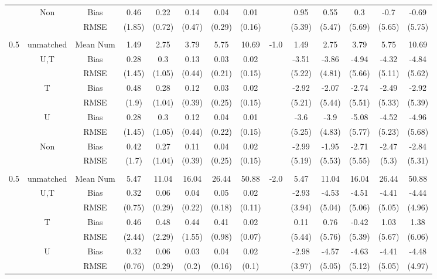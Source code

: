 \begin{tabular}{@{\extracolsep{5pt}}lc|cccccc|lccccc}
 & Non & Bias & 0.46 & 0.22 & 0.14 & 0.04 & 0.01 &  & 0.95 & 0.55 & 0.3 & -0.7 & -0.69 \\
 &  & RMSE & (1.85) & (0.72) & (0.47) & (0.29) & (0.16) &  & (5.39) & (5.47) & (5.69) & (5.65) & (5.75) \\
 &  &  &  &  &  &  &  &  &  &  &  &  &  \\
0.5 & unmatched & Mean Num & 1.49 & 2.75 & 3.79 & 5.75 & 10.69 & -1.0 & 1.49 & 2.75 & 3.79 & 5.75 & 10.69 \\
 & U,T & Bias & 0.28 & 0.3 & 0.13 & 0.03 & 0.02 &  & -3.51 & -3.86 & -4.94 & -4.32 & -4.84 \\
 &  & RMSE & (1.45) & (1.05) & (0.44) & (0.21) & (0.15) &  & (5.22) & (4.81) & (5.66) & (5.11) & (5.62) \\
 & T & Bias & 0.48 & 0.28 & 0.12 & 0.03 & 0.02 &  & -2.92 & -2.07 & -2.74 & -2.49 & -2.92 \\
 &  & RMSE & (1.9) & (1.04) & (0.39) & (0.25) & (0.15) &  & (5.21) & (5.44) & (5.51) & (5.33) & (5.39) \\
 & U & Bias & 0.28 & 0.3 & 0.12 & 0.04 & 0.01 &  & -3.6 & -3.9 & -5.08 & -4.52 & -4.96 \\
 &  & RMSE & (1.45) & (1.05) & (0.44) & (0.22) & (0.15) &  & (5.25) & (4.83) & (5.77) & (5.23) & (5.68) \\
 & Non & Bias & 0.42 & 0.27 & 0.11 & 0.04 & 0.02 &  & -2.99 & -1.95 & -2.71 & -2.47 & -2.84 \\
 &  & RMSE & (1.7) & (1.04) & (0.39) & (0.25) & (0.15) &  & (5.19) & (5.53) & (5.55) & (5.3) & (5.31) \\
 &  &  &  &  &  &  &  &  &  &  &  &  &  \\
0.5 & unmatched & Mean Num & 5.47 & 11.04 & 16.04 & 26.44 & 50.88 & -2.0 & 5.47 & 11.04 & 16.04 & 26.44 & 50.88 \\
 & U,T & Bias & 0.32 & 0.06 & 0.04 & 0.05 & 0.02 &  & -2.93 & -4.53 & -4.51 & -4.41 & -4.44 \\
 &  & RMSE & (0.75) & (0.29) & (0.22) & (0.18) & (0.11) &  & (3.94) & (5.04) & (5.06) & (5.05) & (4.96) \\
 & T & Bias & 0.46 & 0.48 & 0.44 & 0.41 & 0.02 &  & 0.11 & 0.76 & -0.42 & 1.03 & 1.38 \\
 &  & RMSE & (2.44) & (2.29) & (1.55) & (0.98) & (0.07) &  & (5.44) & (5.76) & (5.39) & (5.67) & (6.06) \\
 & U & Bias & 0.32 & 0.06 & 0.03 & 0.04 & 0.02 &  & -2.98 & -4.57 & -4.63 & -4.41 & -4.48 \\
 &  & RMSE & (0.76) & (0.29) & (0.2) & (0.16) & (0.1) &  & (3.97) & (5.05) & (5.12) & (5.05) & (4.97) \\

\end{tabular}
